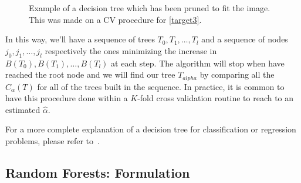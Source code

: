 

\begin{figure}[tb]
\centering
\caption{ Example of a decision tree which has been pruned to fit the image. This was made on a CV procedure for \cref{target3}.}
\label{fig:decision_tree_actual_problem}
\end{figure}




In this way, we'll have a sequence of trees $T_0,T_1,\ldots,T_l$ and a sequence of nodes $j_0, j_1,\ldots,j_l$ respectively the ones minimizing the increase in $B(T_0),B(T_1),\ldots,B(T_l)$ at each step. The algorithm will stop when have reached the root node and we will find our tree $T_{alpha}$ by comparing all the $C_\alpha(T)$ for all of the trees built in the sequence. In practice, it is common to have this procedure done within a $K$-fold cross validation routine to reach to an estimated $\hat{\alpha}$.

For a more complete explanation of a decision tree for classification or regression problems, please refer to~\textcite{breiman-cart84}.


\subsection{ Random Forests: Formulation }


